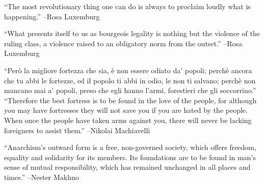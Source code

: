 \documentclass{article}%
\begin{document}
\linebreak%
\vspace{1mm}%
\begin{minipage}{\textwidth}%
\flushleft%
“The most revolutionary thing one can do is always to proclaim loudly what is happening.”%
\linebreak%
\vspace{1mm}%
–Rosa Luxemburg%
\linebreak%
\vspace{1mm}%
\end{minipage}%
\linebreak%
\vspace{1mm}%
\begin{minipage}{\textwidth}%
\flushleft%
“What presents itself to us as bourgeois legality is nothing but the violence of the ruling class, a violence raised to an obligatory norm from the outset.”%
\linebreak%
\vspace{1mm}%
–Rosa Luxemburg%
\linebreak%
\vspace{1mm}%
\end{minipage}%
\linebreak%
\vspace{1mm}%
\begin{minipage}{\textwidth}%
\flushleft%
“Però la migliore fortezza che sia, è non essere odiato da' popoli; perchè ancora che tu abbi le fortezze, ed il popolo ti abbi in odio, le non ti salvano; perchè non mancano mai a’ popoli, preso che egli hanno l’armi, forestieri che gli soccorrino.”%
\linebreak%
\vspace{1mm}%
“Therefore the best fortress is to be found in the love of the people, for although you may have fortresses they will not save you if you are hated by the people. When once the people have taken arms against you, there will never be lacking foreigners to assist them.”%
\linebreak%
–Nikolai Machiavelli%
\linebreak%
\vspace{1mm}%
\end{minipage}%
\linebreak%
\vspace{1mm}%
\begin{minipage}{\textwidth}%
\flushleft%
“Anarchism's outward form is a free, non{-}governed society, which offers freedom, equality and solidarity for its members. Its foundations are to be found in man's sense of mutual responsibility, which has remained unchanged in all places and times.”%
\linebreak%
\vspace{1mm}%
–Nester Makhno%
\linebreak%
\vspace{1mm}%
\end{minipage}%
\end{document}
